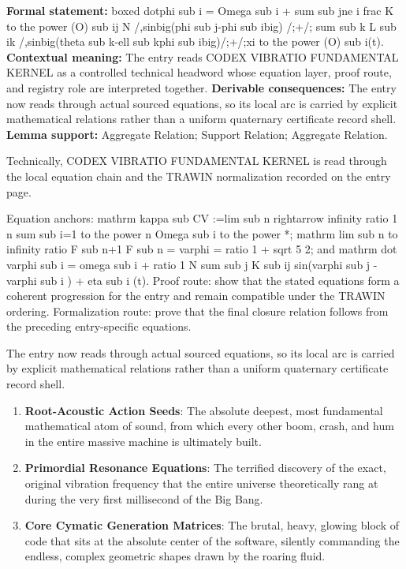 \begingroup\footnotesize\setlength{\emergencystretch}{3em}\sloppy
\textbf{Formal statement:} boxed dotphi sub i = Omega sub i + sum sub jne i frac K to the power (O) sub ij N /,sinbig(phi sub j-phi sub ibig) /;+/; sum sub k L sub ik /,sinbig(theta sub k-ell sub kphi sub ibig)/;+/;xi to the power (O) sub i(t). \textbf{Contextual meaning:} The entry reads CODEX VIBRATIO FUNDAMENTAL KERNEL as a controlled technical headword whose equation layer, proof route, and registry role are interpreted together. \textbf{Derivable consequences:} The entry now reads through actual sourced equations, so its local arc is carried by explicit mathematical relations rather than a uniform quaternary certificate record shell. \textbf{Lemma support:} Aggregate Relation; Support Relation; Aggregate Relation.\par
\endgroup

Technically, CODEX VIBRATIO FUNDAMENTAL KERNEL is read through the local equation chain and the TRAWIN normalization recorded on the entry page.

Equation anchors: mathrm kappa sub CV :=lim sub n rightarrow infinity ratio 1 n sum sub i=1 to the power n Omega sub i to the power *; mathrm lim sub n to infinity ratio F sub n+1 F sub n = varphi = ratio 1 + sqrt 5 2; and mathrm dot varphi sub i = omega sub i + ratio 1 N sum sub j K sub ij sin(varphi sub j -varphi sub i ) + eta sub i (t). Proof route: show that the stated equations form a coherent progression for the entry and remain compatible under the TRAWIN ordering. Formalization route: prove that the final closure relation follows from the preceding entry-specific equations.

The entry now reads through actual sourced equations, so its local arc is carried by explicit mathematical relations rather than a uniform quaternary certificate record shell.
\endgroup

\begin{enumerate}[leftmargin=1.6em,itemsep=6pt,topsep=4pt]
\item \textbf{Root-Acoustic Action Seeds}: The absolute deepest, most fundamental mathematical atom of sound, from which every other boom, crash, and hum in the entire massive machine is ultimately built.
\item \textbf{Primordial Resonance Equations}: The terrified discovery of the exact, original vibration frequency that the entire universe theoretically rang at during the very first millisecond of the Big Bang.
\item \textbf{Core Cymatic Generation Matrices}: The brutal, heavy, glowing block of code that sits at the absolute center of the software, silently commanding the endless, complex geometric shapes drawn by the roaring fluid.
\end{enumerate}


